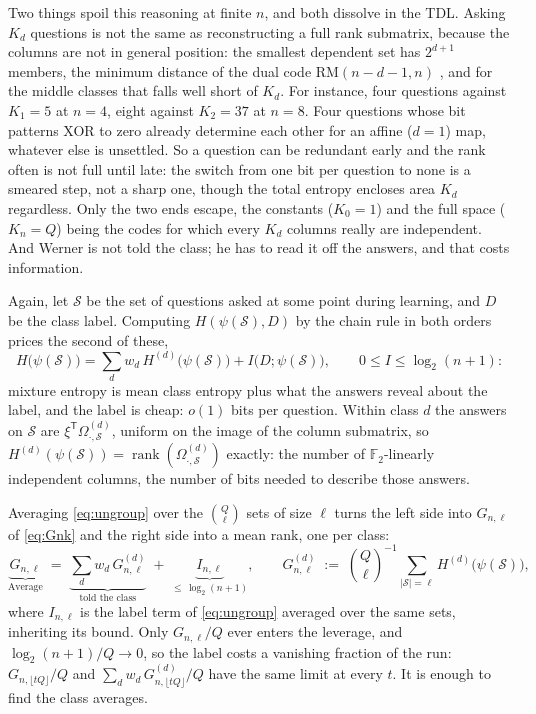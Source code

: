 \documentclass[11pt]{article}
\begin{document}
Two things spoil this reasoning at finite $n$, and both dissolve in the TDL.
Asking $K_d$ questions is not the same as reconstructing a full rank submatrix, because
the columns are not in general position: the smallest dependent set has
$2^{d+1}$ members, the minimum distance of the dual code
$\mathrm{RM}(n{-}d{-}1,n)$ \cite{macwilliams}, and for the middle classes that falls well
short of $K_d$. For instance, four questions against $K_1 = 5$ at $n = 4$, eight
against $K_2 = 37$ at $n = 8$. Four questions whose bit patterns XOR to
zero already determine each other for an affine ($d=1$) map, whatever else is
unsettled. So a question can be redundant early and the rank often is
not full until late: the switch from one bit per question to none is a smeared step,
not a sharp one, though the total entropy encloses area $K_d$ regardless. Only the two
ends escape, the constants ($K_0=1$) and the full space ($K_n = Q$) being the codes for which
every $K_d$ columns really are independent. And Werner is not told the class; he has
to read it off the answers, and that costs information. 

Again, let $\mathcal S$ be the set of questions asked at some point during learning, and $D$ be the class label.
Computing
$H(\psi(\mathcal S), D)$ by the chain rule in both orders prices the
second of these,
%
\begin{equation}
  H\big(\psi(\mathcal S)\big)
  = \sum_d w_d\, H^{(d)}\big(\psi(\mathcal S)\big)
  + I\big(D; \psi(\mathcal S)\big),
  \qquad
  0 \le I \le \log_2(n+1):
  \label{eq:ungroup}
\end{equation}
%
mixture entropy is mean class entropy plus what the answers reveal
about the label, and the label is cheap: $o(1)$ bits per question.
Within class $d$ the answers on $\mathcal S$ are
$\xi^{\mathsf T}\Omega^{(d)}_{\cdot,\mathcal S}$, uniform on the image of
the column submatrix, so
$H^{(d)}(\psi(\mathcal S)) = \operatorname{rank}(\Omega^{(d)}_{\cdot,\mathcal S})$
exactly: the number of $\mathbb F_2$-linearly
independent columns, the number of bits needed to describe those
answers.

Averaging \eqref{eq:ungroup} over the $\binom Q\ell$ sets of size $\ell$
turns the left side into $G_{n,\ell}$ of \eqref{eq:Gnk} and the right
side into a mean rank, one per class:
%
\begin{equation}
  \underbrace{G_{n,\ell}}_{\text{Average}}
  \;=\; \underbrace{\sum_d w_d\, G^{(d)}_{n,\ell}}_{\text{told the class}}
  \;+\; \underbrace{I_{n,\ell}}_{\le\,\log_2(n+1)},
  \qquad
  G^{(d)}_{n,\ell}
  \;:=\; \binom Q\ell^{-1} \sum_{|\mathcal S| = \ell}
    H^{(d)}\big(\psi(\mathcal S)\big),
  \label{eq:Gmix}
\end{equation}
%
where $I_{n,\ell}$ is the label term of \eqref{eq:ungroup} averaged
over the same sets, inheriting its bound. Only $G_{n,\ell}/Q$ ever
enters the leverage, and $\log_2(n+1)/Q \to 0$, so the label costs a
vanishing fraction of the run: $G_{n,\lfloor tQ\rfloor}/Q$ and
$\sum_d w_d\, G^{(d)}_{n,\lfloor tQ\rfloor}/Q$ have the same limit at
every $t$. It is enough to find the class averages.
\end{document}
